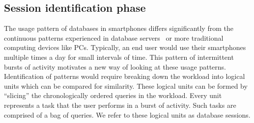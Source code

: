 
\subsection{Session identification phase}
The usage pattern of databases in smartphones differs significantly from the continuous patterns experienced in database servers~\cite{kennedy2015pocket} or more traditional computing devices like PCs.  
Typically, an end user would use their smartphones multiple times a day for small intervals of time. This pattern of intermittent bursts of activity motivates a new way of looking at these usage patterns. Identification of patterns would require breaking down the workload into logical units which can be compared for similarity. These logical units can be formed by ``slicing'' the chronologically ordered queries in the workload. Every unit represents a task that the user performs in a burst of activity. Such tasks are comprised of a bag of queries. We refer to these logical units as database sessions.


